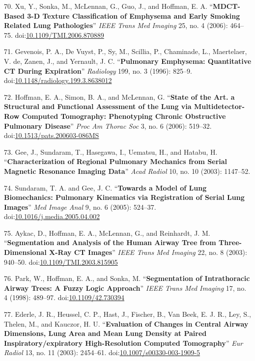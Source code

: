 \documentclass[11pt,]{article}
\begin{document}
\hypertarget{ref-Xu:2006aa}{}
70. Xu, Y., Sonka, M., McLennan, G., Guo, J., and Hoffman, E. A.
``\textbf{MDCT-Based 3-D Texture Classification of Emphysema and Early
Smoking Related Lung Pathologies}'' \emph{IEEE Trans Med Imaging} 25,
no. 4 (2006): 464--75.
doi:\href{https://doi.org/10.1109/TMI.2006.870889}{10.1109/TMI.2006.870889}

\hypertarget{ref-Gevenois:1996aa}{}
71. Gevenois, P. A., De Vuyst, P., Sy, M., Scillia, P., Chaminade, L.,
Maertelaer, V. de, Zanen, J., and Yernault, J. C. ``\textbf{Pulmonary
Emphysema: Quantitative CT During Expiration}'' \emph{Radiology} 199,
no. 3 (1996): 825--9.
doi:\href{https://doi.org/10.1148/radiology.199.3.8638012}{10.1148/radiology.199.3.8638012}

\hypertarget{ref-Hoffman:2006aa}{}
72. Hoffman, E. A., Simon, B. A., and McLennan, G. ``\textbf{State of
the Art. a Structural and Functional Assessment of the Lung via
Multidetector-Row Computed Tomography: Phenotyping Chronic Obstructive
Pulmonary Disease}'' \emph{Proc Am Thorac Soc} 3, no. 6 (2006): 519--32.
doi:\href{https://doi.org/10.1513/pats.200603-086MS}{10.1513/pats.200603-086MS}

\hypertarget{ref-Gee:2003aa}{}
73. Gee, J., Sundaram, T., Hasegawa, I., Uematsu, H., and Hatabu, H.
``\textbf{Characterization of Regional Pulmonary Mechanics from Serial
Magnetic Resonance Imaging Data}'' \emph{Acad Radiol} 10, no. 10 (2003):
1147--52.

\hypertarget{ref-Sundaram:2005aa}{}
74. Sundaram, T. A. and Gee, J. C. ``\textbf{Towards a Model of Lung
Biomechanics: Pulmonary Kinematics via Registration of Serial Lung
Images}'' \emph{Med Image Anal} 9, no. 6 (2005): 524--37.
doi:\href{https://doi.org/10.1016/j.media.2005.04.002}{10.1016/j.media.2005.04.002}

\hypertarget{ref-Aykac:2003aa}{}
75. Aykac, D., Hoffman, E. A., McLennan, G., and Reinhardt, J. M.
``\textbf{Segmentation and Analysis of the Human Airway Tree from
Three-Dimensional X-Ray CT Images}'' \emph{IEEE Trans Med Imaging} 22,
no. 8 (2003): 940--50.
doi:\href{https://doi.org/10.1109/TMI.2003.815905}{10.1109/TMI.2003.815905}

\hypertarget{ref-Park:1998aa}{}
76. Park, W., Hoffman, E. A., and Sonka, M. ``\textbf{Segmentation of
Intrathoracic Airway Trees: A Fuzzy Logic Approach}'' \emph{IEEE Trans
Med Imaging} 17, no. 4 (1998): 489--97.
doi:\href{https://doi.org/10.1109/42.730394}{10.1109/42.730394}

\hypertarget{ref-Ederle:2003aa}{}
77. Ederle, J. R., Heussel, C. P., Hast, J., Fischer, B., Van Beek, E.
J. R., Ley, S., Thelen, M., and Kauczor, H. U. ``\textbf{Evaluation of
Changes in Central Airway Dimensions, Lung Area and Mean Lung Density at
Paired Inspiratory/expiratory High-Resolution Computed Tomography}''
\emph{Eur Radiol} 13, no. 11 (2003): 2454--61.
doi:\href{https://doi.org/10.1007/s00330-003-1909-5}{10.1007/s00330-003-1909-5}
\end{document}
